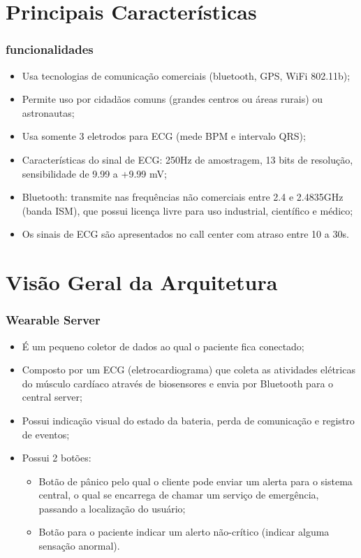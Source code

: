 \documentclass{beamer}
\begin{document}
\section{Principais Características}

\begin{frame}
	\frametitle{funcionalidades}

	\begin{itemize}
		\item Usa tecnologias de comunicação comerciais (bluetooth, GPS, WiFi 802.11b);
		\item Permite uso por cidadãos comuns (grandes centros ou áreas rurais) ou astronautas;
		\item Usa somente 3 eletrodos para ECG (mede BPM e intervalo QRS);
		\item Características do sinal de ECG: 250Hz de amostragem, 13 bits de resolução, sensibilidade de 9.99 a +9.99 mV;
		\item Bluetooth: transmite nas frequências não comerciais entre 2.4 e 2.4835GHz (banda ISM), que possui licença livre para uso industrial, científico e médico;
		\item Os sinais de ECG são apresentados no call center com atraso entre 10 a 30s.
	\end{itemize}
\end{frame}

\section{Visão Geral da Arquitetura}

\begin{frame}
	\frametitle{Wearable Server}

	\begin{itemize}
		\item É um pequeno coletor de dados ao qual o paciente fica conectado;
		\item Composto por um ECG (eletrocardiograma) que coleta as atividades elétricas do músculo cardíaco através de biosensores e envia por Bluetooth para o central server;
		\item Possui indicação visual do estado da bateria, perda de comunicação e registro de eventos;
		\item Possui 2 botões:
		\begin{itemize}
			\item Botão de pânico pelo qual o cliente pode enviar um alerta para o sistema central, o qual se encarrega de chamar um serviço de emergência, passando a localização do usuário;
			\item Botão para o paciente indicar um alerto não-crítico (indicar alguma sensação anormal).
		\end{itemize}
	\end{itemize}
\end{frame}
\end{document}

